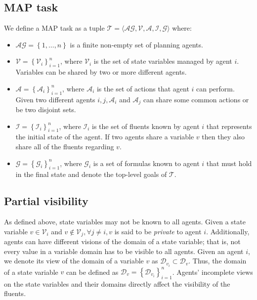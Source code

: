 \documentclass[12pt]{article}
\begin{document}
\subsection{MAP task}

We define a MAP task as a tuple $\mathcal{T} = \langle \mathcal{AG}, \mathcal{V}, \mathcal{A}, \mathcal{I}, \mathcal{G} \rangle$ where:
\begin{itemize}
  \item $\mathcal{AG} = \left\{1, \ldots, n\right\}$ is a finite non-empty set of planning agents.
  \item $\mathcal{V} = \left\{\mathcal{V}_i\right\}^n_{i=1}$, where $\mathcal{V}_i$ is the set of state variables managed by agent $i$.
Variables can be shared by two or more different agents.
  \item $\mathcal{A} = \left\{\mathcal{A}_i\right\}^n_{i=1}$, where $\mathcal{A}_i$ is the set of actions that agent $i$ can perform.
Given two different agents $i, j, \mathcal{A}_i$ and $\mathcal{A}_j$ can share some common actions or be two disjoint sets.
  \item $\mathcal{I} = \left\{\mathcal{I}_i\right\}^n_{i=1}$, where $\mathcal{I}_i$ is the set of fluents known by agent $i$ that represents the initial state of the agent.
If two agents share a variable $v$ then they also share all of the fluents regarding $v$.
  \item $\mathcal{G} = \left\{\mathcal{G}_i\right\}^n_{i=1}$, where $\mathcal{G}_i$ is a set of formulas known to agent $i$ that must hold in the final state and denote the top-level goals of $\mathcal{T}$.
\end{itemize}

\subsection{Partial visibility}

As defined above, state variables may not be known to all agents.
Given a state variable $v \in \mathcal{V}_i$ and $v \notin \mathcal{V}_j, \forall j \neq i, v$ is said to be \textit{private} to agent $i$.
Additionally, agents can have different visions of the domain of a state variable; that is, not every value in a variable domain has to be visible to all agents.
Given an agent $i$, we denote its view of the domain of a variable $v$ as $\mathcal{D}_{v_i} \subset \mathcal{D}_v$.
Thus, the domain of a state variable $v$ can be defined as $\mathcal{D}_v = \left\{\mathcal{D}_{v_i}\right\}^n_{i=1}$.
Agents’ incomplete views on the state variables and their domains directly affect the visibility of the fluents.
\end{document}
